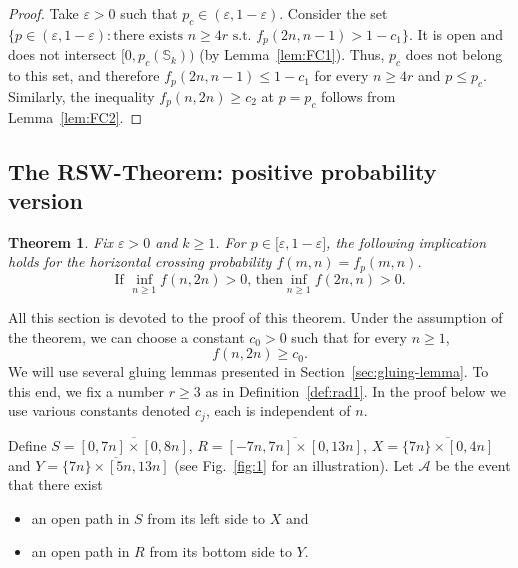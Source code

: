 \documentclass[12pt, twoside,a4paper,reqno]{amsart}
\theoremstyle{plain}
\newtheorem{theorem}{Theorem}[section]
\theoremstyle{remark}
\theoremstyle{definition}
\newcommand{\eps}{\varepsilon}
\newcommand{\ol}{\overline}
\begin{document}
\begin{proof}
Take $\eps >0$ such that $p_c \in (\eps, 1-\eps)$. Consider the set \\$\{p\in (\eps, 1-\eps):\text{there exists $n \ge 4r$ s.t. }%
f_p(2n,n-1)>1-c_{1}\}$. It is open and does not intersect $[0,p_{c}(\mathbb %
S_{k}))$ (by Lemma~\ref{lem:FC1}). Thus,
$p_{c}$ does not belong to this set, and therefore $f_p(2n,n-1)\leq 1-c_{1}$ for
every $n \ge 4r$ and $p\leq p_{c}$. Similarly, the inequality $%
f_p(n,2n)\geq c_{2}$ at $p=p_{c}$ follows from Lemma~\ref{lem:FC2}.
\end{proof}




\subsection{The RSW-Theorem: positive probability version\label{sec:RSWpf}}

\begin{theorem}
\label{thm:RSW} Fix $\eps>0$ and $k\ge1$. For $p\in \lbrack \eps,1-\eps]$, the following implication holds
for the horizontal crossing probability $f(m,n)=f_p(m,n)$.%
\begin{equation}
\text{If $\displaystyle\inf_{n\ge1}{f(n,2n)}>0$, then
$\displaystyle\inf_{n\ge1}{f(2n,n)}>0$.}\label{eq:48}
\end{equation}

\end{theorem}


All this section is devoted to the proof of this theorem. Under the assumption of the theorem, we can choose a
constant $c_0>0$ such that for every $n\ge1$,
\begin{equation}
  \label{eq:38}
  f(n,2n)\ge c_0.
\end{equation}
We will use several gluing lemmas presented in Section~\ref{sec:gluing-lemma}.
To this end, we fix a number $r\ge 3$ as in Definition~\ref{def:rad1}. In the
proof below we use various constants denoted $c_j$, each is independent of $n$.

Define $S=\ol{[0,7n]\times[0,8n]}$, $R=\ol{[-7n,7n]\times[0,13n]}$, $
X=\ol{\{7n\}\times[0,4n]}$ and $Y=\ol{\{7n\}\times[5n,13n]}$ (see
Fig.~\ref{fig:1} for an illustration). Let $\mathcal A$ be the event that there exist
\begin{itemize}
\item an open path in $S$ from its left side to $X$ and
\item an open path in $R$ from its bottom side to $Y$.
\end{itemize}
\end{document}
